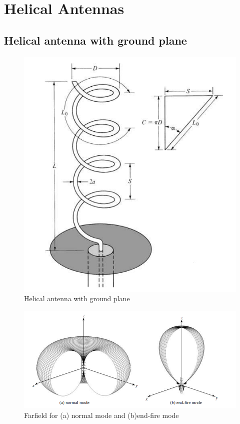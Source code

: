 \section{Helical Antennas}
\subsection{Helical antenna with ground plane}

\begin{figure}[H]
\centering 
\includegraphics[scale = 0.5]{figures/antennas/helical/helical}
\caption{Helical antenna with ground plane \citep{Balanis2005}}
\label{fig:helical}
\end{figure}

\begin{figure}[H]
\centering 
\includegraphics[scale = 0.5]{figures/antennas/helical/modes}
\caption{Farfield for (a) normal mode and (b)end-fire mode \citep{Balanis2005}}
\label{fig:helical_modes}
\end{figure}

